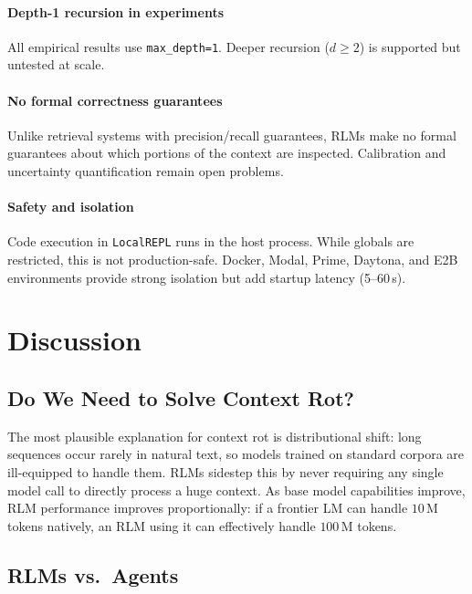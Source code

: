 \documentclass[journal, 10pt, letterpaper]{IEEEtran}
\newcommand{\code}[1]{\texttt{#1}}
\begin{document}
\paragraph{Depth-1 recursion in experiments}
All empirical results use \code{max\_depth=1}.  Deeper recursion ($d \ge 2$)
is supported but untested at scale.

\paragraph{No formal correctness guarantees}
Unlike retrieval systems with precision/recall guarantees, RLMs make no formal
guarantees about which portions of the context are inspected.  Calibration and
uncertainty quantification remain open problems.

\paragraph{Safety and isolation}
Code execution in \code{LocalREPL} runs in the host process.  While globals
are restricted, this is not production-safe.  Docker, Modal, Prime, Daytona,
and E2B environments provide strong isolation but add startup latency
(5--60\,s).

\section{Discussion}
\label{sec:discussion}

\subsection{Do We Need to Solve Context Rot?}

The most plausible explanation for context rot is distributional shift: long
sequences occur rarely in natural text, so models trained on standard corpora
are ill-equipped to handle them.  RLMs sidestep this by never requiring any
single model call to directly process a huge context.  As base model
capabilities improve, RLM performance improves proportionally: if a frontier
LM can handle $10\,\text{M}$ tokens natively, an RLM using it can effectively
handle $100\,\text{M}$ tokens.

\subsection{RLMs vs.\ Agents}
\end{document}
